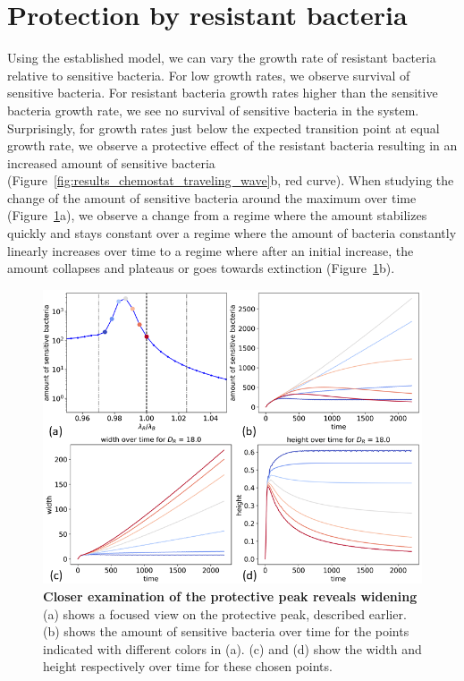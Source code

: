 \section{Protection by resistant bacteria}
\label{sec:protective_effect}
Using the established model, we can vary the growth rate of resistant bacteria relative to sensitive bacteria. For low growth rates, we observe survival of sensitive bacteria. For resistant bacteria growth rates higher than the sensitive bacteria growth rate, we see no survival of sensitive bacteria in the system. Surprisingly, for growth rates just below the expected transition point at equal growth rate, we observe a protective effect of the resistant bacteria resulting in an increased amount of sensitive bacteria (Figure~\ref{fig:results_chemostat_traveling_wave}b, red curve). When studying the change of the amount of sensitive bacteria around the maximum over time (Figure~\ref{fig:results_peak_change_height_width}a), we observe a change from a regime where the amount stabilizes quickly and stays constant over a regime where the amount of bacteria constantly linearly increases over time to a regime where after an initial increase, the amount collapses and plateaus or goes towards extinction (Figure~\ref{fig:results_peak_change_height_width}b).

\begin{figure}
\centering
\includegraphics[width=\linewidth]{graphics/2025_09_26_phages_fig3.png}
\caption{\textbf{Closer examination of the protective peak reveals widening} (a) shows a focused view on the protective peak, described earlier. (b) shows the amount of sensitive bacteria over time for the points indicated with different colors in (a). (c) and (d) show the width and height respectively over time for these chosen points.}
\label{fig:results_peak_change_height_width}
\end{figure}

